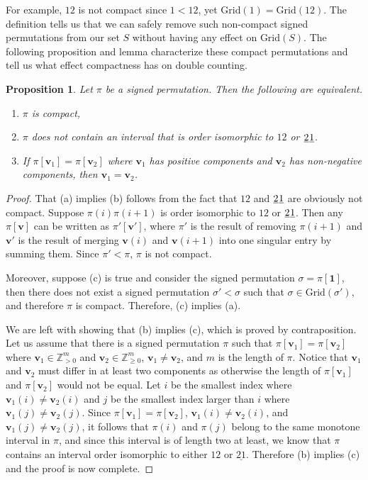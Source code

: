 \documentclass{article}
\numberwithin{equation}{section}
\newtheorem{prop}[thm]{Proposition}
\theoremstyle{definition}
\newcommand{\V}{\textbf{v}}
\newcommand{\one}{\textbf{1}}
\newcommand{\Grid}{\text{Grid}}
\begin{document}
For example, $12$ is not compact since $1<12$, yet $\Grid(1)=\Grid(12)$.  The definition tells us that we can safely remove such non-compact signed permutations from our set $S$ without having any effect on $\Grid(S)$.  The following proposition and lemma characterize these compact permutations and tell us what effect compactness has on double counting.

\begin{prop}\label{prop:compact}
Let $\pi$ be a signed permutation. Then the following are equivalent.
\begin{enumerate}
    \item[(a)] $\pi$ is compact,
    \item[(b)] $\pi$ does not contain an interval that is order isomorphic to $12$ or $\underline{2}\hspace{0.02cm}\underline{1}$. 
    \item[(c)] If $\pi[\V_1]=\pi[\V_2]$ where $\V_1$ has positive components and $\V_2$ has non-negative components, then $\V_1=\V_2$.
\end{enumerate}
\end{prop}


\begin{proof}
That (a) implies (b) follows from the fact that $12$ and $\underline{2}\hspace{0.02cm}\underline{1}$ are obviously not compact.  Suppose $\pi(i)\pi(i+1)$ is order isomorphic to $12$ or $\underline{2}\hspace{0.02cm}\underline{1}$.  Then any $\pi[\V]$ can be written as $\pi'[\V']$, where $\pi'$ is the result of removing $\pi(i+1)$ and $\V'$ is the result of merging $\V(i)$ and $\V(i+1)$ into one singular entry by summing them.  Since $\pi' < \pi$, $\pi$ is not compact.

Moreover, suppose (c) is true and consider the signed permutation $\sigma=\pi[\one]$, then there does not exist a signed permutation $\sigma'<\sigma$ such that $\sigma\in\Grid(\sigma')$, and therefore $\pi$ is compact. Therefore, (c) implies (a).

We are left with showing that (b) implies (c), which is proved by contraposition. Let us assume that there is a signed permutation $\pi$ such that $\pi[\V_1]=\pi[\V_2]$ where $\V_1\in\mathbb{Z}_{>0}^m$ and $\V_2\in\mathbb{Z}_{\geq0}^m$, $\V_1\neq \V_2$, and $m$ is the length of $\pi.$ Notice that $\V_1$ and $\V_2$ must differ in at least two components as otherwise the length of $\pi[\V_1]$ and $\pi[\V_2]$ would not be equal. Let $i$ be the smallest index where $\V_1(i)\neq \V_2(i)$ and $j$ be the smallest index larger than $i$ where $\V_1(j)\neq \V_2(j)$. Since $\pi[\V_1]=\pi[\V_2]$, $\V_1(i)\neq \V_2(i)$, and $\V_1(j)\neq \V_2(j)$, it follows that $\pi(i)$ and $\pi(j)$ belong to the same monotone interval in $\pi$, and since this interval is of length two at least, we know that $\pi$ contains an interval order isomorphic to either $12$ or $\underline{21}$. Therefore (b) implies (c) and the proof is now complete. 
\end{proof}
\end{document}
